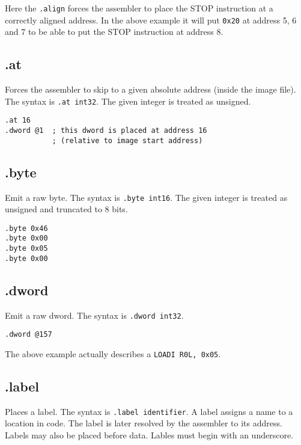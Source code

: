 Here the \verb|.align| forces the assembler to place the STOP instruction at a correctly aligned address. In the above example it will
put \verb|0x20| at address 5, 6 and 7 to be able to put the STOP instruction at address 8.

\subsection{.at}

Forces the assembler to skip to a given absolute address (inside the image file). The syntax is \verb|.at int32|. The given integer is treated as unsigned. 

\begin{verbatim}
.at 16
.dword @1  ; this dword is placed at address 16 
           ; (relative to image start address)
\end{verbatim}

\subsection{.byte}

Emit a raw byte. The syntax is \verb|.byte int16|. The given integer is treated as unsigned and truncated to 8 bits. 

\begin{verbatim}
.byte 0x46
.byte 0x00
.byte 0x05
.byte 0x00
\end{verbatim}

\subsection{.dword}

Emit a raw dword. The syntax is \verb|.dword int32|. 

\begin{verbatim}
.dword @157
\end{verbatim}

The above example actually describes a \verb|LOADI R0L, 0x05|.

\subsection{.label}

Places a label. The syntax is \verb|.label identifier|. A label assigns a name to a location in code. The label is later resolved by the assembler to its address. Labels
may also be placed before data. Lables must begin with an underscore.


